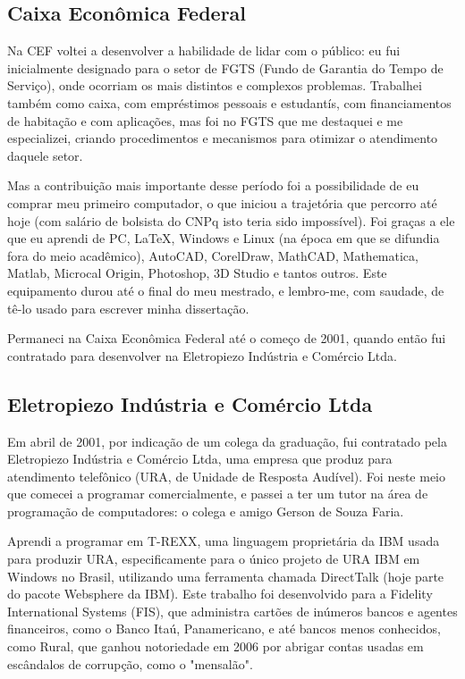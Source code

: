 \subsection{Caixa Econômica Federal}
\label{sec:cef}

Na CEF voltei a desenvolver a habilidade de lidar com o público: eu fui inicialmente designado para o setor de FGTS (Fundo de Garantia do Tempo de Serviço), onde ocorriam os mais distintos e complexos problemas. Trabalhei também como caixa, com empréstimos pessoais e estudantís, com financiamentos de habitação e com aplicações, mas foi no FGTS que me destaquei e me especializei, criando procedimentos e mecanismos para otimizar o atendimento daquele setor.

Mas a contribuição mais importante desse período foi a possibilidade de eu comprar meu primeiro computador, o que iniciou a trajetória que percorro até hoje (com salário de bolsista do CNPq isto teria sido impossível). Foi graças a ele que eu aprendi  de PC, \LaTeX, Windows e Linux (na época em que se difundia fora do meio acadêmico), AutoCAD, CorelDraw, MathCAD, Mathematica, Matlab, Microcal Origin, Photoshop, 3D Studio e tantos outros. Este equipamento durou até o final do meu mestrado, e lembro-me, com saudade, de tê-lo usado para escrever minha dissertação.

Permaneci na Caixa Econômica Federal até o começo de 2001, quando então fui contratado para desenvolver  na Eletropiezo Indústria e Comércio Ltda.

\subsection{Eletropiezo Indústria e Comércio Ltda}
\label{sec:eletropiezo}

Em abril de 2001, por indicação de um colega da graduação, fui contratado pela Eletropiezo Indústria e Comércio Ltda, uma empresa que produz  para atendimento telefônico (URA, de Unidade de Resposta Audível). Foi neste meio que comecei a programar comercialmente, e passei a ter um tutor na área de programação de computadores: o colega e amigo Gerson de Souza Faria.

Aprendi a programar em T-REXX, uma linguagem proprietária da IBM usada para produzir URA, especificamente para o único projeto de URA IBM em Windows no Brasil, utilizando uma ferramenta chamada DirectTalk (hoje parte do pacote Websphere da IBM). Este trabalho foi desenvolvido para a Fidelity International Systems (FIS), que administra cartões de inúmeros bancos e agentes financeiros, como o Banco Itaú, Panamericano, e até bancos menos conhecidos, como Rural, que ganhou notoriedade em 2006 por abrigar contas usadas em escândalos de corrupção, como o "mensalão".

